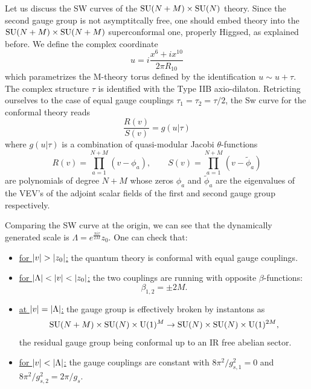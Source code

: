     Let us discuss the SW curves of the $\text{SU}(N+M)\times\text{SU}(N)$ theory. Since the second gauge group is not asymptitcally free, one should embed theory into the $\text{SU}(N+M)\times\text{SU}(N+M)$ superconformal one, properly Higgsed, as explained before. We define the complex coordinate
    \begin{equation}
        u=i\frac{x^6+ix^{10}}{2\pi R_{10}}
    \end{equation}
    which parametrizes the M-theory torus defined by the identification $u\sim u+\tau$. The complex structure $\tau$ is identified with the Type IIB axio-dilaton. Retricting ourselves to the case of equal gauge couplings $\tau_1=\tau_2=\tau/2$, the Sw curve for the conformal theory reads
    \begin{equation}
        \frac{R(v)}{S(v)}=g(u|\tau)
    \end{equation}
    where $g(u|\tau)$ is a combination of quasi-modular Jacobi $\theta$-functions
    \begin{equation}
        R(v)=\prod^{N+M}_{a=1}(v-\phi_a),\qquad S(v)=\prod^{N+M}_{a=1}(v-\tilde{\phi}_a)
    \end{equation}
    are polynomials of degree $N+M$ whose zeros $\phi_a$ and $\tilde{\phi}_a$ are the eigenvalues of the VEV's of the adjoint scalar fields of the first and second gauge group respectively. 
    
    Comparing the SW curve at the origin, we can see that the dynamically generated scale is $\Lambda=e^{\frac{\pi i \tau}{2M}}z_0$. One can check that:
    \begin{itemize}
        \item \underline{for $\abs{v}>\abs{z_0}$:} the quantum theory is conformal with equal gauge couplings.
        \item \underline{for $\abs{\Lambda}<\abs{v}<\abs{z_0}$:} the two couplings are running with opposite $\beta$-functions:
        \begin{equation}
            \beta_{1,2} = \pm 2M\label{eq:betafct}.
        \end{equation}
        \item \underline{at $\abs{v}=\abs{\Lambda}$:} the gauge group is effectively broken by instantons as
        \begin{equation}
            \text{SU}(N+M)\times\text{SU}(N)\times\text{U}(1)^M\to\text{SU}(N)\times\text{SU}(N)\times\text{U}(1)^{2M},
        \end{equation}
        the residual gauge group being conformal up to an IR free abelian sector.
        \item \underline{for $\abs{v}<\abs{\Lambda}$:} the gauge couplings are constant with $8\pi^2/g^2_{s,1}=0$ and $8\pi^2/g^2_{s,2}=2\pi/g_s$.
    \end{itemize}

